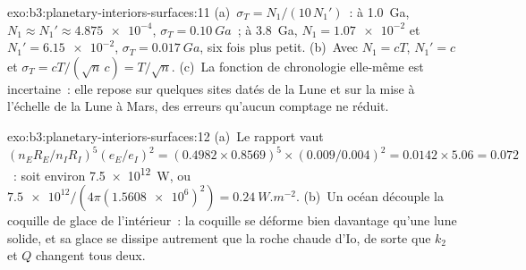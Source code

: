 \begin{solution}{exo:b3:planetary-interiors-surfaces:11}
(a)~$\sigma_T = N_1/(10\,N_1')$~: à \qty{1.0}{Ga}, $N_1 \approx N_1' \approx
\num{4.875e-4}$, $\sigma_T = \qty{0.10}{Ga}$~; à \qty{3.8}{Ga}, $N_1 =
\num{1.07e-2}$ et $N_1' = \num{6.15e-2}$, $\sigma_T = \qty{0.017}{Ga}$,
six fois plus petit. (b)~Avec $N_1 = cT$, $N_1' = c$ et $\sigma_T =
cT/(\sqrt n\,c) = T/\sqrt n$. (c)~La fonction de chronologie elle-même est
incertaine~: elle repose sur quelques sites datés de la Lune et sur la mise à l'échelle
de la Lune à Mars, des erreurs qu'aucun comptage ne réduit.
\end{solution}

\begin{solution}{exo:b3:planetary-interiors-surfaces:12}
(a)~Le rapport vaut $(n_ER_E/n_IR_I)^5(e_E/e_I)^2 = (0.4982\times0.8569)^5
\times(0.009/0.004)^2 = 0.0142\times5.06 = 0.072$~: soit environ
\qty{7.5e12}{W}, ou $\num{7.5e12}/(4\pi(\num{1.5608e6})^2) =
\qty{0.24}{W.m^{-2}}$. (b)~Un océan découple la coquille de glace de
l'intérieur~: la coquille se déforme bien davantage qu'une lune solide, et sa glace
se dissipe autrement que la roche chaude d'Io, de sorte que $k_2$ et $Q$ changent tous deux.
\end{solution}

